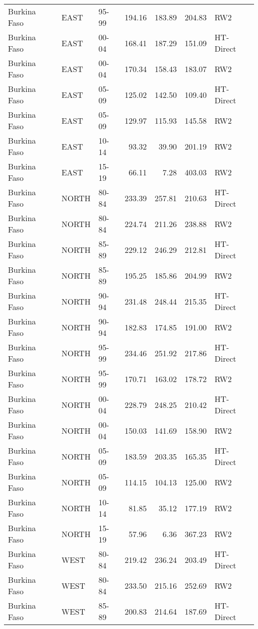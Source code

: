 \begin{longtable}{lllrrrl}
  Burkina Faso & EAST & 95-99 & 194.16 & 183.89 & 204.83 & RW2 \\ 
  Burkina Faso & EAST & 00-04 & 168.41 & 187.29 & 151.09 & HT-Direct \\ 
  Burkina Faso & EAST & 00-04 & 170.34 & 158.43 & 183.07 & RW2 \\ 
  Burkina Faso & EAST & 05-09 & 125.02 & 142.50 & 109.40 & HT-Direct \\ 
  Burkina Faso & EAST & 05-09 & 129.97 & 115.93 & 145.58 & RW2 \\ 
  Burkina Faso & EAST & 10-14 & 93.32 & 39.90 & 201.19 & RW2 \\ 
  Burkina Faso & EAST & 15-19 & 66.11 & 7.28 & 403.03 & RW2 \\ 
  Burkina Faso & NORTH & 80-84 & 233.39 & 257.81 & 210.63 & HT-Direct \\ 
  Burkina Faso & NORTH & 80-84 & 224.74 & 211.26 & 238.88 & RW2 \\ 
  Burkina Faso & NORTH & 85-89 & 229.12 & 246.29 & 212.81 & HT-Direct \\ 
  Burkina Faso & NORTH & 85-89 & 195.25 & 185.86 & 204.99 & RW2 \\ 
  Burkina Faso & NORTH & 90-94 & 231.48 & 248.44 & 215.35 & HT-Direct \\ 
  Burkina Faso & NORTH & 90-94 & 182.83 & 174.85 & 191.00 & RW2 \\ 
  Burkina Faso & NORTH & 95-99 & 234.46 & 251.92 & 217.86 & HT-Direct \\ 
  Burkina Faso & NORTH & 95-99 & 170.71 & 163.02 & 178.72 & RW2 \\ 
  Burkina Faso & NORTH & 00-04 & 228.79 & 248.25 & 210.42 & HT-Direct \\ 
  Burkina Faso & NORTH & 00-04 & 150.03 & 141.69 & 158.90 & RW2 \\ 
  Burkina Faso & NORTH & 05-09 & 183.59 & 203.35 & 165.35 & HT-Direct \\ 
  Burkina Faso & NORTH & 05-09 & 114.15 & 104.13 & 125.00 & RW2 \\ 
  Burkina Faso & NORTH & 10-14 & 81.85 & 35.12 & 177.19 & RW2 \\ 
  Burkina Faso & NORTH & 15-19 & 57.96 & 6.36 & 367.23 & RW2 \\ 
  Burkina Faso & WEST & 80-84 & 219.42 & 236.24 & 203.49 & HT-Direct \\ 
  Burkina Faso & WEST & 80-84 & 233.50 & 215.16 & 252.69 & RW2 \\ 
  Burkina Faso & WEST & 85-89 & 200.83 & 214.64 & 187.69 & HT-Direct \\ 

\end{longtable}
